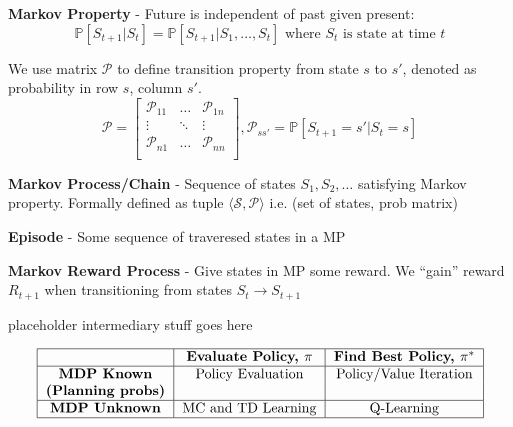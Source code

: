 \documentclass[a4paper,10pt,twocolumn]{article}
\begin{document}
\begin{tcolorbox}[title={Reinforcement Learning}, module]
    \textbf{Markov Property} - Future is independent of past given present:
    \[
        \mathbb{P}[S_{t + 1} | S_t] = \mathbb{P}[S_{t + 1} | S_1, \ldots, S_t] \text{ where } S_t \text{ is state at time } t
    \]

    We use matrix $\mathcal{P}$ to define transition property from state $s$ to $s'$, denoted as probability in row $s$, column $s'$.
    \[
        \mathcal{P} =
        \begin{bmatrix}
            \mathcal{P}_{11} & \ldots & \mathcal{P}_{1n} \\
            \vdots & \ddots & \vdots \\
            \mathcal{P}_{n1} & \ldots & \mathcal{P}_{nn} \\
        \end{bmatrix}
        , \mathcal{P}_{ss'} = \mathbb{P}[S_{t+1} = s' | S_t = s]
    \]

    \textbf{Markov Process/Chain} - Sequence of states $S_1, S_2, \ldots$ satisfying Markov property. Formally defined as tuple $\langle \mathcal{S}, \mathcal{P} \rangle$ i.e. (set of states, prob matrix)

    \textbf{Episode} - Some sequence of traveresed states in a MP

    \textbf{Markov Reward Process} - Give states in MP some reward. We ``gain'' reward $R_{t + 1}$ when transitioning from states $S_t \to S_{t + 1}$

    placeholder intermediary stuff goes here

    \[
        \begin{tabular}{|c|c|c|}
            \hline
            & \textbf{Evaluate Policy, $\pi$} & \textbf{Find Best Policy, $\pi^*$} \\
            \hline
            \textbf{MDP Known} & Policy Evaluation & Policy/Value Iteration \\
            \textbf{(Planning probs)} && \\
            \hline
            \textbf{MDP Unknown} & MC and TD Learning & Q-Learning \\
            \hline
        \end{tabular}
    \]

\end{tcolorbox}
\end{document}
